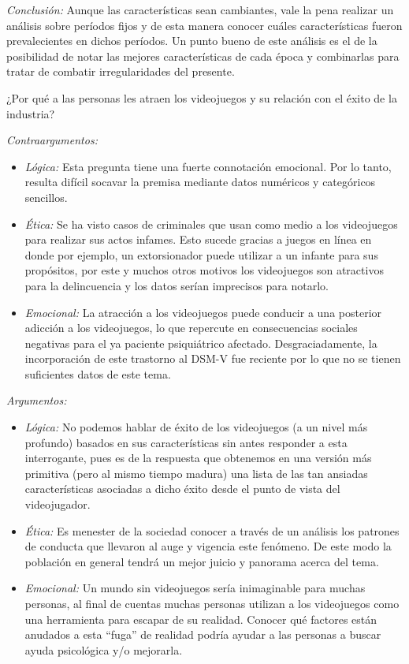 \documentclass[
  letterpaper,
  DIV=11,
  numbers=noendperiod]{scrreprt}
\begin{document}
\emph{Conclusión:} Aunque las características sean cambiantes, vale la
pena realizar un análisis sobre períodos fijos y de esta manera conocer
cuáles características fueron prevalecientes en dichos períodos. Un
punto bueno de este análisis es el de la posibilidad de notar las
mejores características de cada época y combinarlas para tratar de
combatir irregularidades del presente.

¿Por qué a las personas les atraen los videojuegos y su relación con el
éxito de la industria?

\emph{Contraargumentos:}

\begin{itemize}
\item
  \emph{Lógica:} Esta pregunta tiene una fuerte connotación emocional.
  Por lo tanto, resulta difícil socavar la premisa mediante datos
  numéricos y categóricos sencillos.
\item
  \emph{Ética:} Se ha visto casos de criminales que usan como medio a
  los videojuegos para realizar sus actos infames. Esto sucede gracias a
  juegos en línea en donde por ejemplo, un extorsionador puede utilizar
  a un infante para sus propósitos, por este y muchos otros motivos los
  videojuegos son atractivos para la delincuencia y los datos serían
  imprecisos para notarlo.
\item
  \emph{Emocional:} La atracción a los videojuegos puede conducir a una
  posterior adicción a los videojuegos, lo que repercute en
  consecuencias sociales negativas para el ya paciente psiquiátrico
  afectado. Desgraciadamente, la incorporación de este trastorno al
  DSM-V fue reciente por lo que no se tienen suficientes datos de este
  tema.
\end{itemize}

\emph{Argumentos:}

\begin{itemize}
\item
  \emph{Lógica:} No podemos hablar de éxito de los videojuegos (a un
  nivel más profundo) basados en sus características sin antes responder
  a esta interrogante, pues es de la respuesta que obtenemos en una
  versión más primitiva (pero al mismo tiempo madura) una lista de las
  tan ansiadas características asociadas a dicho éxito desde el punto de
  vista del videojugador.
\item
  \emph{Ética:} Es menester de la sociedad conocer a través de un
  análisis los patrones de conducta que llevaron al auge y vigencia este
  fenómeno. De este modo la población en general tendrá un mejor juicio
  y panorama acerca del tema.
\item
  \emph{Emocional:} Un mundo sin videojuegos sería inimaginable para
  muchas personas, al final de cuentas muchas personas utilizan a los
  videojuegos como una herramienta para escapar de su realidad. Conocer
  qué factores están anudados a esta ``fuga'' de realidad podría ayudar
  a las personas a buscar ayuda psicológica y/o mejorarla.
\end{itemize}
\end{document}
